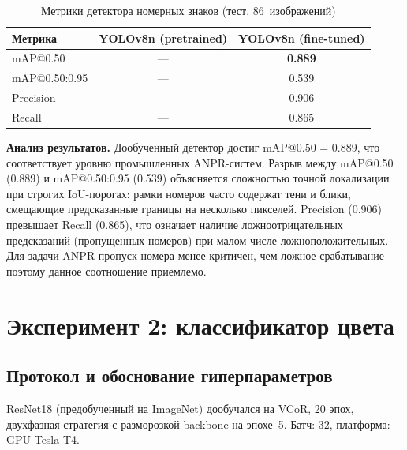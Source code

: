 \documentclass[14pt,a4paper]{report}
\numberwithin{equation}{chapter}
\numberwithin{figure}{chapter}
\numberwithin{table}{chapter}
\begin{document}
\begin{table}[H]
\centering
\caption{Метрики детектора номерных знаков (тест, 86~изображений)}
\label{tab:plate_det}
\begin{tabular}{lcc}
\toprule
\textbf{Метрика} & \textbf{YOLOv8n (pretrained)} & \textbf{YOLOv8n (fine-tuned)} \\
\midrule
mAP@0.50       & --- & \textbf{0.889} \\
mAP@0.50:0.95  & --- & 0.539 \\
Precision      & --- & 0.906 \\
Recall         & --- & 0.865 \\
\bottomrule
\end{tabular}
\end{table}

\textbf{Анализ результатов.}
Дообученный детектор достиг mAP@0.50 = 0.889, что соответствует
уровню промышленных ANPR-систем. Разрыв между mAP@0.50 (0.889) и
mAP@0.50:0.95 (0.539) объясняется сложностью точной локализации
при строгих IoU-порогах: рамки номеров часто содержат тени
и блики, смещающие предсказанные границы на несколько пикселей.
Precision (0.906) превышает Recall (0.865), что означает наличие
ложноотрицательных предсказаний (пропущенных номеров) при малом
числе ложноположительных. Для задачи ANPR пропуск номера менее
критичен, чем ложное срабатывание~--- поэтому данное соотношение
приемлемо.

\section{Эксперимент 2: классификатор цвета}

\subsection{Протокол и обоснование гиперпараметров}

ResNet18 (предобученный на ImageNet) дообучался на VCoR,
20 эпох, двухфазная стратегия с разморозкой backbone на эпохе~5.
Батч: 32, платформа: GPU Tesla T4.
\end{document}
